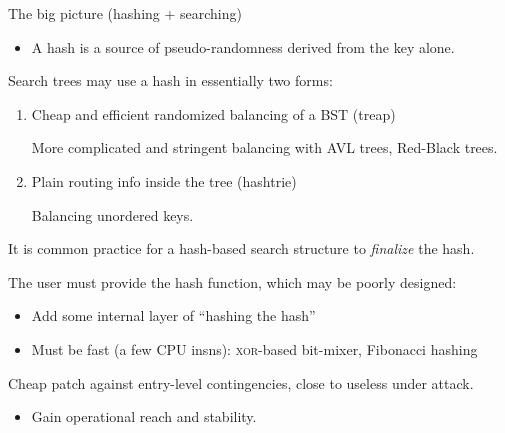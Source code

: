 \begin{frame}[fragile]{The big picture (hashing + searching)}

  \begin{itemize}
  \item A hash is a source of pseudo-randomness derived from the key alone.
  \end{itemize}

  Search trees may use a hash in essentially two forms:

  \begin{enumerate}
  \item Cheap and efficient randomized balancing of a BST (treap)

    More complicated and stringent balancing with AVL trees, Red-Black trees.
  \item Plain routing info inside the tree (hashtrie)

    Balancing unordered keys.
  \end{enumerate}

  It is common practice for a hash-based search structure to {\em finalize} the hash.

  The user must provide the hash function, which may be poorly designed:
  \begin{itemize}
  \item Add some internal layer of ``hashing the hash''
  \item Must be fast (a few CPU insns): \textsc{xor}-based bit-mixer, Fibonacci hashing
  \end{itemize}

  Cheap patch against entry-level contingencies, close to useless under attack.
  \begin{itemize}
  \item Gain operational reach and stability.
  \end{itemize}
  
\end{frame}


